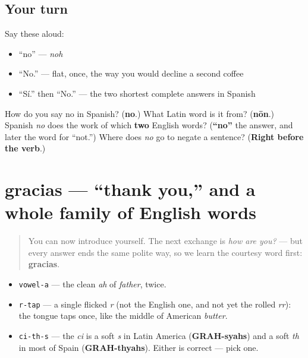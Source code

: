 \subsection*{Your turn}
Say these aloud:

\begin{itemize}
\raggedright
  \item \textquotedblleft{}no\textquotedblright{} — \emph{noh}
  \item \textquotedblleft{}No.\textquotedblright{} — flat, once, the way you would decline a second coffee
  \item \textquotedblleft{}Sí.\textquotedblright{} then \textquotedblleft{}No.\textquotedblright{} — the two shortest complete answers in Spanish
\end{itemize}

\begin{tcolorbox}[breakable,colback=teal!4,colframe=teal!35!black,title={Before you move on}]
How do you say no in Spanish? (\textbf{no}.) What Latin word is it from? (\textbf{nōn}.) Spanish \emph{no} does the work of which \textbf{two} English words? (\textbf{\textquotedblleft{}no\textquotedblright{}} the answer, and later the word for \textquotedblleft{}not.\textquotedblright{}) Where does \emph{no} go to negate a sentence? (\textbf{Right before the verb}.)
\end{tcolorbox}
\section[gracias]{gracias — \textquotedblleft{}thank you,\textquotedblright{} and a whole family of English words}

\label{lesson:ES-C04-gracias}



\begin{quote}
You can now introduce yourself. The next exchange is \emph{how are you?} — but every answer ends the same polite way, so we learn the courtesy word first: \textbf{gracias}.
\end{quote}

\begin{sounds}
\begin{itemize}
\raggedright
  \item \texttt{vowel-a} — the clean \emph{ah} of \emph{father}, twice.
  \item \texttt{r-tap} — a single flicked \emph{r} (not the English one, and not yet the rolled \emph{rr}): the tongue taps once, like the middle of American \emph{butter}.
  \item \texttt{ci-th-s} — the \emph{ci} is a soft \emph{s} in Latin America (\textbf{GRAH-syahs}) and a soft \emph{th} in most of Spain (\textbf{GRAH-thyahs}). Either is correct — pick one.
\end{itemize}
\end{sounds}

